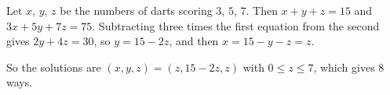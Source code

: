 Let $x$, $y$, $z$ be the numbers of darts scoring $3$, $5$, $7$. Then $x+y+z=15$ and $3x+5y+7z=75$. Subtracting three times the first equation from the second gives $2y+4z=30$, so $y=15-2z$, and then $x=15-y-z=z$.

So the solutions are $(x,y,z)=(z,15-2z,z)$ with $0\le z\le7$, which gives $\boxed{8}$ ways.

